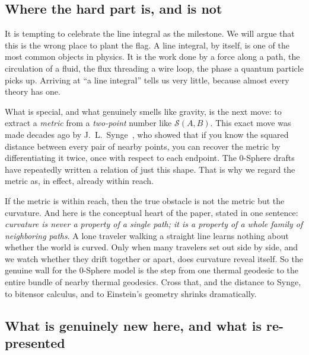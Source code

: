 \documentclass[%
 reprint, amsmath,amssymb, aps, prb, ]{revtex4-2}
\numberwithin{equation}{section}
\begin{document}
\subsection{Where the hard part is, and is not}

It is tempting to celebrate the line integral as the milestone. We will argue that this is the wrong place to plant the flag. A line integral, by itself, is one of the most common objects in physics. It is the work done by a force along a path, the circulation of a fluid, the flux threading a wire loop, the phase a quantum particle picks up. Arriving at ``a line integral'' tells us very little, because almost every theory has one.

What is special, and what genuinely smells like gravity, is the next move: to extract a \emph{metric} from a \emph{two-point} number like $\mathcal{S}(A,B)$. This exact move was made decades ago by J.~L.~Synge~\cite{Synge1960}, who showed that if you know the squared distance between every pair of nearby points, you can recover the metric by differentiating it twice, once with respect to each endpoint. The 0-Sphere drafts have repeatedly written a relation of just this shape. That is why we regard the metric as, in effect, already within reach.

If the metric is within reach, then the true obstacle is not the metric but the curvature. And here is the conceptual heart of the paper, stated in one sentence: \emph{curvature is never a property of a single path; it is a property of a whole family of neighboring paths}. A lone traveler walking a straight line learns nothing about whether the world is curved. Only when many travelers set out side by side, and we watch whether they drift together or apart, does curvature reveal itself. So the genuine wall for the 0-Sphere model is the step from one thermal geodesic to the entire bundle of nearby thermal geodesics. Cross that, and the distance to Synge, to bitensor calculus, and to Einstein's geometry shrinks dramatically.

\subsection{What is genuinely new here, and what is re-presented}
\label{subsec:newold}
\end{document}
